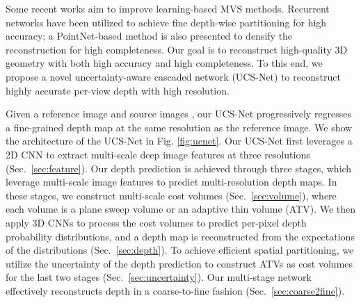 \label{sec:method}
 
Some recent works aim to improve learning-based MVS methods. 
Recurrent networks \cite{yao2019recurrent} have been utilized to achieve fine depth-wise partitioning for high accuracy; 
a PointNet-based method \cite{chen2019point} is also presented to densify the reconstruction for high completeness.
Our goal is to reconstruct high-quality 3D geometry with both high accuracy and high completeness.
To this end, we propose a novel uncertainty-aware cascaded network (UCS-Net) to reconstruct highly accurate per-view depth with high resolution. 

Given a reference image  and  source images , 
our UCS-Net progressively regresses a fine-grained depth map at the same resolution as the reference image.
We show the architecture of the UCS-Net in Fig. \ref{fig:ucnet}.
Our UCS-Net first leverages a 2D CNN to extract multi-scale deep image features at three resolutions (Sec.~\ref{sec:feature}).
Our depth prediction is achieved through three stages, 
which leverage multi-scale image features to predict multi-resolution depth maps.
In these stages, we construct multi-scale cost volumes (Sec.~\ref{sec:volume}), where each volume is a plane sweep volume or an adaptive thin volume (ATV).
We then apply 3D CNNs to process the cost volumes to predict per-pixel depth probability distributions, 
and a depth map is reconstructed from the expectations of the distributions (Sec.~\ref{sec:depth}).
To achieve efficient spatial partitioning, 
we utilize the uncertainty of the depth prediction to construct ATVs as cost volumes for the last two stages (Sec.~\ref{sec:uncertainty}).
Our multi-stage network effectively reconstructs depth in a coarse-to-fine fashion (Sec.~\ref{sec:coarse2fine}).




